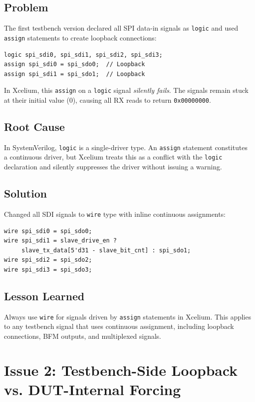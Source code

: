 \subsection{Problem}

The first testbench version declared all SPI data-in signals as \texttt{logic} and used
\texttt{assign} statements to create loopback connections:

\begin{lstlisting}
logic spi_sdi0, spi_sdi1, spi_sdi2, spi_sdi3;
assign spi_sdi0 = spi_sdo0;  // Loopback
assign spi_sdi1 = spi_sdo1;  // Loopback
\end{lstlisting}

In Xcelium, this \texttt{assign} on a \texttt{logic} signal \emph{silently fails}. The signals
remain stuck at their initial value (0), causing all RX reads to return \texttt{0x00000000}.

\subsection{Root Cause}

In SystemVerilog, \texttt{logic} is a single-driver type. An \texttt{assign} statement constitutes
a continuous driver, but Xcelium treats this as a conflict with the \texttt{logic} declaration and
silently suppresses the driver without issuing a warning.

\subsection{Solution}

Changed all SDI signals to \texttt{wire} type with inline continuous assignments:
\begin{lstlisting}
wire spi_sdi0 = spi_sdo0;
wire spi_sdi1 = slave_drive_en ?
     slave_tx_data[5'd31 - slave_bit_cnt] : spi_sdo1;
wire spi_sdi2 = spi_sdo2;
wire spi_sdi3 = spi_sdo3;
\end{lstlisting}

\subsection{Lesson Learned}

Always use \texttt{wire} for signals driven by \texttt{assign} statements in Xcelium. This
applies to any testbench signal that uses continuous assignment, including loopback connections,
BFM outputs, and multiplexed signals.

\section{Issue 2: Testbench-Side Loopback vs. DUT-Internal Forcing}


